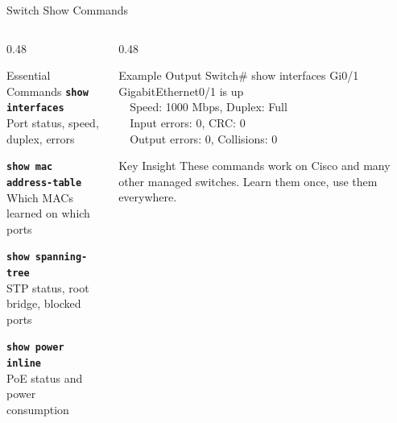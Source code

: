 \documentclass[aspectratio=169]{beamer}  %
\begin{document}
\begin{frame}{Switch Show Commands}
    \begin{columns}[T]
        \begin{column}{0.48\textwidth}
            \begin{block}{Essential Commands}
                \small
                \texttt{\textbf{show interfaces}} \\
                Port status, speed, duplex, errors
                
                \vspace{0.3em}
                \texttt{\textbf{show mac address-table}} \\
                Which MACs learned on which ports
                
                \vspace{0.3em}
                \texttt{\textbf{show spanning-tree}} \\
                STP status, root bridge, blocked ports
                
                \vspace{0.3em}
                \texttt{\textbf{show power inline}} \\
                PoE status and power consumption
            \end{block}
        \end{column}
        \begin{column}{0.48\textwidth}
            \begin{block}{Example Output}
                \ttfamily\scriptsize
                Switch\# show interfaces Gi0/1 \\
                GigabitEthernet0/1 is up \\
                \ \ Speed: 1000 Mbps, Duplex: Full \\
                \ \ Input errors: 0, CRC: 0 \\
                \ \ Output errors: 0, Collisions: 0
            \end{block}
            
            \vspace{0.3em}
            \begin{alertblock}{Key Insight}
                These commands work on Cisco and many other managed switches. Learn them once, use them everywhere.
            \end{alertblock}
        \end{column}
    \end{columns}
\end{frame}
\end{document}
